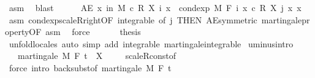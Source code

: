\begin{isabellebody}
\ asm\ \isamarkupfalse%
\ blast\isanewline
\ \ \ \ \isamarkupfalse%
\ {\isachardoublequoteopen}AE\ x\ in\ M{\isachardot}{\kern0pt}\ c\ {\isacharasterisk}{\kern0pt}\isactrlsub R\ X\ i\ x\ {\isacharequal}{\kern0pt}\ cond{\isacharunderscore}{\kern0pt}exp\ M\ {\isacharparenleft}{\kern0pt}F\ i{\isacharparenright}{\kern0pt}\ {\isacharparenleft}{\kern0pt}{\isasymlambda}x{\isachardot}{\kern0pt}\ c\ {\isacharasterisk}{\kern0pt}\isactrlsub R\ X\ j\ x{\isacharparenright}{\kern0pt}\ x{\isachardoublequoteclose}\ \isamarkupfalse%
\ asm\ cond{\isacharunderscore}{\kern0pt}exp{\isacharunderscore}{\kern0pt}scaleR{\isacharunderscore}{\kern0pt}right{\isacharbrackleft}{\kern0pt}OF\ integrable{\isacharcomma}{\kern0pt}\ of\ j{\isacharcomma}{\kern0pt}\ THEN\ AE{\isacharunderscore}{\kern0pt}symmetric{\isacharbrackright}{\kern0pt}\ martingale{\isacharunderscore}{\kern0pt}property{\isacharbrackleft}{\kern0pt}OF\ asm{\isacharbrackright}{\kern0pt}\ \isamarkupfalse%
\ force\isanewline
\ \ \isacommand{{\isacharbraceright}{\kern0pt}}\isamarkupfalse%
\isanewline
\ \ \isamarkupfalse%
\ {\isacharquery}{\kern0pt}thesis\ \isamarkupfalse%
\ {\isacharparenleft}{\kern0pt}unfold{\isacharunderscore}{\kern0pt}locales{\isacharparenright}{\kern0pt}\ {\isacharparenleft}{\kern0pt}auto\ simp\ add{\isacharcolon}{\kern0pt}\ integrable\ martingale{\isachardot}{\kern0pt}integrable{\isacharparenright}{\kern0pt}\isanewline
{}\isamarkupfalse%
%
\endisatagproof
{\isafoldproof}%
%
\isadelimproof
\isanewline
%
\endisadelimproof
\isanewline
{}\isamarkupfalse%
\ uminus{\isacharbrackleft}{\kern0pt}intro{\isacharbrackright}{\kern0pt}{\isacharcolon}{\kern0pt}\isanewline
\ \ \ {\isachardoublequoteopen}martingale\ M\ F\ t\ {\isacharparenleft}{\kern0pt}{\isacharminus}{\kern0pt}\ X{\isacharparenright}{\kern0pt}{\isachardoublequoteclose}\ \isanewline
%
\isadelimproof
\ \ %
\endisadelimproof
%
\isatagproof
{}\isamarkupfalse%
\ scaleR{\isacharunderscore}{\kern0pt}const{\isacharbrackleft}{\kern0pt}of\ {\isachardoublequoteopen}{\isacharminus}{\kern0pt}{}{\isachardoublequoteclose}{\isacharbrackright}{\kern0pt}\ \isamarkupfalse%
\ {\isacharparenleft}{\kern0pt}force\ intro{\isacharcolon}{\kern0pt}\ back{\isacharunderscore}{\kern0pt}subst{\isacharbrackleft}{\kern0pt}of\ {\isachardoublequoteopen}martingale\ M\ F\ t%

\end{isabellebody}
